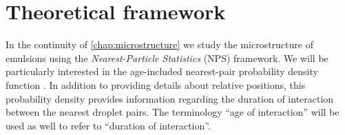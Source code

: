 \section{Theoretical framework}
\label{sec:Theory}

In the continuity of \ref{chap:microstructure} \citep{fintzi2024buoyancy} we study the microstructure of emulsions using the \textit{Nearest-Particle Statistics} (NPS) framework. 
We will be particularly interested in the age-included nearest-pair probability density function \citep{zhang2021ensemble}. 
In addition to providing details about relative positions, this probability density provides information regarding the duration of interaction between the nearest droplet pairs. 
The terminology ``age of interaction'' will be used as well to refer to ``duration of interaction''.  

